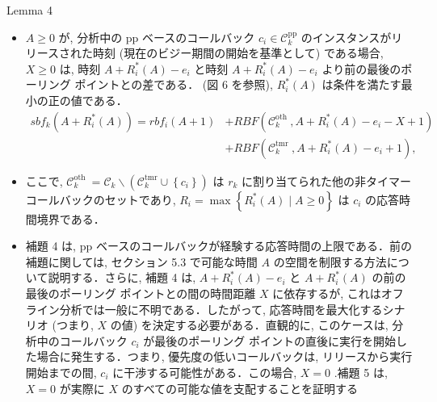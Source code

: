 \begin{frame}[label=lemma4]{Lemma 4}
    \begin{lemma}[]
        \begin{itemize}
            \item $A \geq 0$ が, 分析中の pp ベースのコールバック $c_{i} \in \mathcal{C}_{k}^{\mathrm{pp}}$ のインスタンスがリリースされた時刻 (現在のビジー期間の開始を基準として) である場合, $X \geq 0$ は, 時刻 $A+R_{i}^{*}(A)-e_{i}$ と時刻 $A+R_{i}^{*}(A)-e_{i}$ より前の最後のポーリング ポイントとの差である． (図 6 を参照), $R_{i}^{*}(A)$ は条件を満たす最小の正の値である．
                  \begin{equation*}
                      \begin{aligned}
                          s b f_{k}\left(A+R_{i}^{*}(A)\right)=r b f_{i}(A+1) & +R B F\left(\mathcal{C}_{k}^{\text {oth }}, A+R_{i}^{*}(A)-e_{i}-X+1\right) \\
                                                                              & +R B F\left(\mathcal{C}_{k}^{\text {tmr }}, A+R_{i}^{*}(A)-e_{i}+1\right),
                      \end{aligned}
                  \end{equation*}
            \item ここで, $\mathcal{C}_{k}^{\text {oth }}=\mathcal{C}_{k} \backslash\left(\mathcal{C}_{k}^{\mathrm{tmr}} \cup\left\{c_{i}\right\}\right)$ は $r_{k}$ に割り当てられた他の非タイマー コールバックのセットであり, $R_{i}=\max \left\{R_{i}^{*}(A) \mid A \geq 0\right\}$ は $c_{i}$ の応答時間境界である．
        \end{itemize}
    \end{lemma}
\end{frame}

\begin{frame}{}
    \begin{itemize}
        \item 補題 4 は, pp ベースのコールバックが経験する応答時間の上限である．前の補題に関しては, セクション 5.3 で可能な時間 $A$ の空間を制限する方法について説明する．さらに, 補題 4 は, $A+R_{i}^{*}(A)-e_{i}$ と $A+R_{i}^{*}(A)$ の前の最後のポーリング ポイントとの間の時間距離 $X$ に依存するが, これはオフライン分析では一般に不明である．したがって, 応答時間を最大化するシナリオ (つまり,  $X$ の値) を決定する必要がある．直観的に, このケースは, 分析中のコールバック $c_{i}$ が最後のポーリング ポイントの直後に実行を開始した場合に発生する．つまり, 優先度の低いコールバックは, リリースから実行開始までの間, $c_{i}$ に干渉する可能性がある．この場合, $X=0$ .補題 5 は, $X=0$ が実際に $X$ のすべての可能な値を支配することを証明する
    \end{itemize}
\end{frame}

